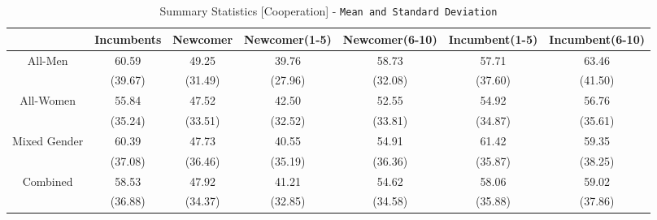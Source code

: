 \begin{table}
    \begin{tabular}{ccccccc}
    \toprule
        & Incumbents & Newcomer & Newcomer(1-5) & Newcomer(6-10) &  Incumbent(1-5) & Incumbent(6-10) \\
        \midrule
        All-Men      & 60.59 & 49.25  & 39.76    & 58.73   &    57.71 & 63.46\\
                    & (39.67) & (31.49) & (27.96)  & (32.08)  &  (37.60) & (41.50)\\
        \addlinespace
        All-Women &   55.84 &   47.52 & 42.50    &  52.55  &    54.92 &   56.76\\
                        & (35.24) & (33.51) & (32.52) & (33.81) &  (34.87) & (35.61)\\
        \addlinespace
        Mixed Gender     & 60.39 &  47.73 & 40.55 & 54.91  &    61.42 &    59.35 \\
                        & (37.08) &   (36.46) & (35.19)  & (36.36) &  (35.87) &  (38.25)\\
        \addlinespace
        Combined &    58.53 &  47.92 & 41.21   &  54.62  &    58.06&    59.02 \\
                        & (36.88) & (34.37) & (32.85) & (34.58) &  (35.88) &  (37.86) \\
    \bottomrule
    \end{tabular}
    \caption{Summary Statistics [Cooperation] - \texttt{Mean and Standard Deviation} }
    \label{tab:my_label}
\end{table}
